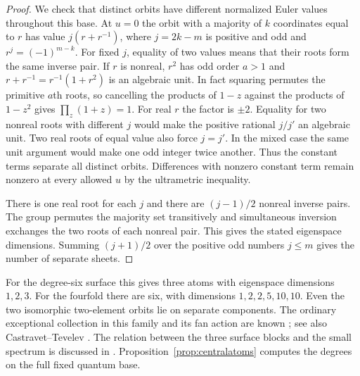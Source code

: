 \begin{proof}
We check that distinct orbits have different normalized Euler values throughout this base. At $u=0$ the orbit with a majority of $k$ coordinates equal to $r$ has value $j(r+r^{-1})$, where $j=2k-m$ is positive and odd and $r^j=(-1)^{m-k}$. For fixed $j$, equality of two values means that their roots form the same inverse pair. If $r$ is nonreal, $r^2$ has odd order $a>1$ and $r+r^{-1}=r^{-1}(1+r^2)$ is an algebraic unit. In fact squaring permutes the primitive $a$th roots, so cancelling the products of $1-z$ against the products of $1-z^2$ gives $\prod_z(1+z)=1$. For real $r$ the factor is $\pm2$. Equality for two nonreal roots with different $j$ would make the positive rational $j/j'$ an algebraic unit. Two real roots of equal value also force $j=j'$. In the mixed case the same unit argument would make one odd integer twice another. Thus the constant terms separate all distinct orbits. Differences with nonzero constant term remain nonzero at every allowed $u$ by the ultrametric inequality.

There is one real root for each $j$ and there are $(j-1)/2$ nonreal inverse pairs. The group permutes the majority set transitively and simultaneous inversion exchanges the two roots of each nonreal pair. This gives the stated eigenspace dimensions. Summing $(j+1)/2$ over the positive odd numbers $j\le m$ gives the number of separate sheets.
\end{proof}

For the degree-six surface this gives three atoms with eigenspace dimensions $1,2,3$. For the fourfold there are six, with dimensions $1,2,2,5,10,10$. Even the two isomorphic two-element orbits lie on separate components. The ordinary exceptional collection in this family and its fan action are known \cite[Proposition~4.12]{BDM}; see also Castravet--Tevelev \cite[Theorem~6.6]{CTI}. The relation between the three surface blocks and the small spectrum is discussed in \cite[Remark~1.6]{ESS}. Proposition~\ref{prop:centralatoms} computes the degrees on the full fixed quantum base.
